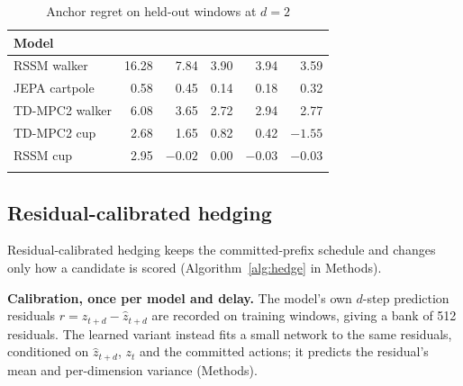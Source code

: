 \documentclass[pdflatex,sn-nature]{sn-jnl}%
\begin{document}
\begin{table}[t]
\caption{Anchor regret on held-out windows at $d=2$}\label{tab:diag}
\begin{tabular*}{\textwidth}{@{\extracolsep\fill}lrrrrr@{}}
\toprule
Model
& 
& 
& 
& 
&  \\
\midrule
RSSM walker & 16.28 & 7.84 & 3.90 & 3.94 & 3.59 \\
JEPA cartpole & 0.58 & 0.45 & 0.14 & 0.18 & 0.32 \\
TD-MPC2 walker & 6.08 & 3.65 & 2.72 & 2.94 & 2.77 \\
TD-MPC2 cup & 2.68 & 1.65 & 0.82 & 0.42 & $-1.55$ \\
RSSM cup & 2.95 & $-0.02$ & 0.00 & $-0.03$ & $-0.03$ \\
\botrule
\end{tabular*}
\end{table}

\subsection{Residual-calibrated hedging}\label{sec:hedged-scoring}

Residual-calibrated hedging keeps the committed-prefix schedule and changes only how a candidate is scored (Algorithm~\ref{alg:hedge} in Methods).

\textbf{Calibration, once per model and delay.} The model's own $d$-step prediction residuals $r = z_{t+d} - \hat z_{t+d}$ are recorded on training windows, giving a bank of 512 residuals. The learned variant instead fits a small network to the same residuals, conditioned on $\hat z_{t+d}$, $z_t$ and the committed actions; it predicts the residual's mean and per-dimension variance (Methods).
\end{document}
